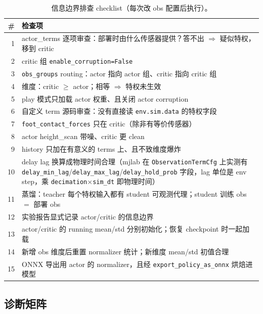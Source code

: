 \begin{table}[H]
\centering
\small
\caption{信息边界排查 checklist（每次改 obs 配置后执行）。}
\label{tab:rlmc-priv-checklist}
\begin{tabular}{@{}rp{10.6cm}@{}}
\toprule
\# & 检查项 \\
\midrule
1 & actor\_terms 逐项审查：部署时由什么传感器提供？答不出 $\Rightarrow$ 疑似特权，移到 critic \\
2 & critic 组 \texttt{enable\_corruption=False} \\
3 & \texttt{obs\_groups} routing：actor 指向 actor 组、critic 指向 critic 组 \\
4 & 维度：critic $\ge$ actor；相等 $\Rightarrow$ 特权未生效 \\
5 & play 模式只加载 actor 权重、且关闭 actor corruption \\
6 & 自定义 term 源码审查：没有直接读 \texttt{env.sim.data} 的特权字段 \\
7 & \texttt{foot\_contact\_forces} 只在 critic（除非有等价传感器） \\
8 & actor height\_scan 带噪、critic 更 clean \\
9 & history 只加在有意义的 terms 上、且不致维度爆炸 \\
10 & delay lag 换算成物理时间合理（mjlab 在 \texttt{ObservationTermCfg} 上实测有 \texttt{delay\_min\_lag}/\texttt{delay\_max\_lag}/\texttt{delay\_hold\_prob} 字段，lag 单位是 env step，乘 \texttt{decimation}$\times$\texttt{sim\_dt} 即物理时间） \\
11 & 蒸馏：teacher 每个特权输入都有 student 可观测代理；student 训练 obs $=$ 部署 obs \\
12 & 实验报告显式记录 actor/critic 的信息边界 \\
13 & actor/critic 的 running mean/std 分别初始化；恢复 checkpoint 时一起加载 \\
14 & 新增 obs 维度后重置 normalizer 统计；新维度 mean/std 初值合理 \\
15 & ONNX 导出用 actor 的 normalizer，且经 \texttt{export\_policy\_as\_onnx} 烘焙进模型 \\
\bottomrule
\end{tabular}
\end{table}

\subsection{诊断矩阵}
\label{sec:rlmc-priv-diagmatrix}

